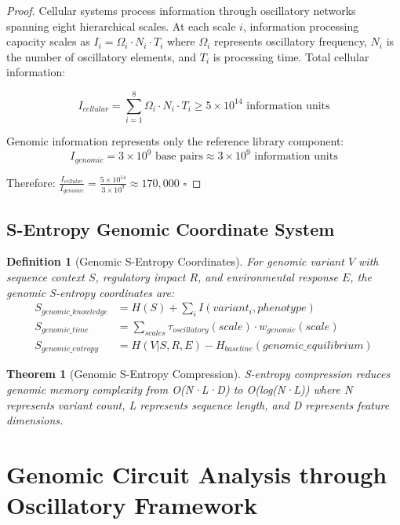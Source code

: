 \documentclass[12pt,a4paper]{article}
\newtheorem{theorem}{Theorem}
\newtheorem{definition}{Definition}
\begin{document}
\begin{proof}
Cellular systems process information through oscillatory networks spanning eight hierarchical scales. At each scale $i$, information processing capacity scales as $I_i = \Omega_i \cdot N_i \cdot T_i$ where $\Omega_i$ represents oscillatory frequency, $N_i$ is the number of oscillatory elements, and $T_i$ is processing time. Total cellular information:

\begin{equation}
I_{cellular} = \sum_{i=1}^{8} \Omega_i \cdot N_i \cdot T_i \geq 5 \times 10^{14} \text{ information units}
\end{equation}

Genomic information represents only the reference library component:
\begin{equation}
I_{genomic} = 3 \times 10^9 \text{ base pairs} \approx 3 \times 10^9 \text{ information units}
\end{equation}

Therefore: $\frac{I_{cellular}}{I_{genomic}} = \frac{5 \times 10^{14}}{3 \times 10^9} \approx 170,000$ $\square$
\end{proof}

\subsection{S-Entropy Genomic Coordinate System}

\begin{definition}[Genomic S-Entropy Coordinates]
For genomic variant $V$ with sequence context $S$, regulatory impact $R$, and environmental response $E$, the genomic S-entropy coordinates are:
\begin{align}
S_{genomic\_knowledge} &= H(S) + \sum_{i} I(variant_i, phenotype) \\
S_{genomic\_time} &= \sum_{scales} \tau_{oscillatory}(scale) \cdot w_{genomic}(scale) \\
S_{genomic\_entropy} &= H(V|S,R,E) - H_{baseline}(genomic\_equilibrium)
\end{align}
\end{definition}

\begin{theorem}[Genomic S-Entropy Compression]
S-entropy compression reduces genomic memory complexity from O(N·L·D) to O(log(N·L)) where N represents variant count, L represents sequence length, and D represents feature dimensions.
\end{theorem}

\section{Genomic Circuit Analysis through Oscillatory Framework}
\end{document}
